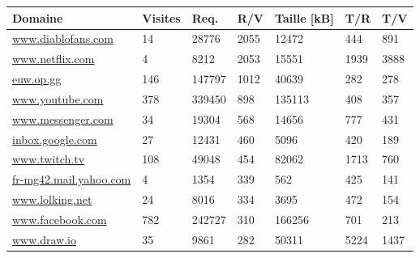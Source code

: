 \begin{table}[h]
\centering
\begin{tabular}{lllllll}
\textbf{Domaine}          & \textbf{Visites} & \textbf{Req.} & \textbf{R/V} & \textbf{Taille [kB]} & \textbf{T/R} & \textbf{T/V} \\ \hline
\scriptsize \url{www.diablofans.com}        & 14             & 28776         & 2055                           & 12472         & 444                     & 891                       \\
\scriptsize \url{www.netflix.com}           & 4              & 8212          & 2053                           & 15551         & 1939                    & 3888                      \\
\scriptsize \url{euw.op.gg}                 & 146            & 147797        & 1012                           & 40639         & 282                     & 278                       \\
\scriptsize \url{www.youtube.com}           & 378            & 339450        & 898                            & 135113        & 408                     & 357                       \\
\scriptsize \url{www.messenger.com}         & 34             & 19304         & 568                            & 14656         & 777                     & 431                       \\
\scriptsize \url{inbox.google.com}          & 27             & 12431         & 460                            & 5096          & 420                     & 189                       \\
\scriptsize \url{www.twitch.tv}             & 108            & 49048         & 454                            & 82062         & 1713                    & 760                       \\
\scriptsize \url{fr-mg42.mail.yahoo.com}    & 4              & 1354          & 339                            & 562           & 425                     & 141                       \\
\scriptsize \url{www.lolking.net}           & 24             & 8016          & 334                            & 3695          & 472                     & 154                       \\
\scriptsize \url{www.facebook.com}          & 782            & 242727        & 310                            & 166256        & 701                     & 213                       \\
\scriptsize \url{www.draw.io}               & 35             & 9861          & 282                            & 50311         & 5224                    & 1437                      \\

\end{tabular}
\end{table}
